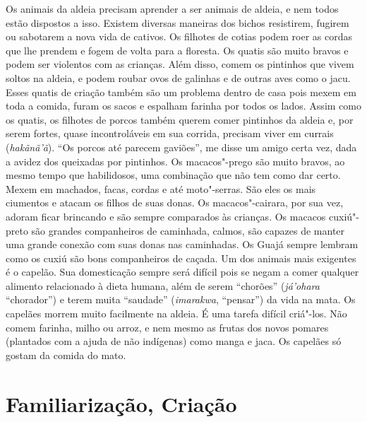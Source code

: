 Os animais da aldeia precisam aprender a ser animais de aldeia, e nem
todos estão dispostos a isso. Existem diversas maneiras dos bichos
resistirem, fugirem ou sabotarem a nova vida de cativos. Os filhotes de
cotias podem roer as cordas que lhe prendem e fogem de volta para a
floresta. Os quatis são muito bravos e podem ser violentos com as
crianças. Além disso, comem os pintinhos que vivem soltos na aldeia, e
podem roubar ovos de galinhas e de outras aves como o jacu. Esses quatis
de criação também são um problema dentro de casa pois mexem em toda a
comida, furam os sacos e espalham farinha por todos os lados. Assim como
os quatis, os filhotes de porcos também querem comer pintinhos da aldeia
e, por serem fortes, quase incontroláveis em sua corrida, precisam viver
em currais (\emph{hakãnã'ã}). ``Os porcos até parecem gaviões'', me
disse um amigo certa vez, dada a avidez dos queixadas por pintinhos. Os
macacos"-prego são muito bravos, ao mesmo tempo que habilidosos, uma
combinação que não tem como dar certo. Mexem em machados, facas, cordas
e até moto"-serras. São eles os mais ciumentos e atacam os filhos de suas
donas. Os macacos"-cairara, por sua vez, adoram ficar brincando e são
sempre comparados às crianças. Os macacos cuxiú"-preto são grandes
companheiros de caminhada, calmos, são capazes de manter uma grande
conexão com suas donas nas caminhadas. Os Guajá sempre lembram como os
cuxiú são bons companheiros de caçada. Um dos animais mais exigentes é o
capelão. Sua domesticação sempre será difícil pois se negam a comer
qualquer alimento relacionado à dieta humana, além de serem ``chorões''
(\emph{já'ohara} ``chorador'') e terem muita ``saudade''
(\emph{imarakwa}, ``pensar'') da vida na mata. Os capelães morrem muito
facilmente na aldeia. É uma tarefa difícil criá"-los. Não comem farinha,
milho ou arroz, e nem mesmo as frutas dos novos pomares (plantados com a
ajuda de não indígenas) como manga e jaca. Os capelães só gostam da
comida do mato.

\section{Familiarização, Criação}

